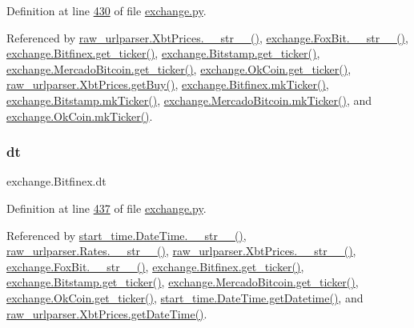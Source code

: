 Definition at line \hyperlink{exchange_8py_source_l00430}{430} of file \hyperlink{exchange_8py_source}{exchange.\+py}.



Referenced by \hyperlink{raw__urlparser_8py_source_l00074}{raw\+\_\+urlparser.\+Xbt\+Prices.\+\_\+\+\_\+str\+\_\+\+\_\+()}, \hyperlink{exchange_8py_source_l00610}{exchange.\+Fox\+Bit.\+\_\+\+\_\+str\+\_\+\+\_\+()}, \hyperlink{exchange_8py_source_l00439}{exchange.\+Bitfinex.\+get\+\_\+ticker()}, \hyperlink{exchange_8py_source_l00511}{exchange.\+Bitstamp.\+get\+\_\+ticker()}, \hyperlink{exchange_8py_source_l00651}{exchange.\+Mercado\+Bitcoin.\+get\+\_\+ticker()}, \hyperlink{exchange_8py_source_l00716}{exchange.\+Ok\+Coin.\+get\+\_\+ticker()}, \hyperlink{raw__urlparser_8py_source_l00062}{raw\+\_\+urlparser.\+Xbt\+Prices.\+get\+Buy()}, \hyperlink{exchange_8py_source_l00453}{exchange.\+Bitfinex.\+mk\+Ticker()}, \hyperlink{exchange_8py_source_l00525}{exchange.\+Bitstamp.\+mk\+Ticker()}, \hyperlink{exchange_8py_source_l00665}{exchange.\+Mercado\+Bitcoin.\+mk\+Ticker()}, and \hyperlink{exchange_8py_source_l00730}{exchange.\+Ok\+Coin.\+mk\+Ticker()}.

\mbox{\label{classexchange_1_1_bitfinex_adc9e5a19056dcc22e8028e749b233795}} 
\subsubsection{\texorpdfstring{dt}{dt}}
{\footnotesize\ttfamily exchange.\+Bitfinex.\+dt}



Definition at line \hyperlink{exchange_8py_source_l00437}{437} of file \hyperlink{exchange_8py_source}{exchange.\+py}.



Referenced by \hyperlink{start__time_2____init_____8py_source_l00034}{start\+\_\+time.\+Date\+Time.\+\_\+\+\_\+str\+\_\+\+\_\+()}, \hyperlink{raw__urlparser_8py_source_l00038}{raw\+\_\+urlparser.\+Rates.\+\_\+\+\_\+str\+\_\+\+\_\+()}, \hyperlink{raw__urlparser_8py_source_l00074}{raw\+\_\+urlparser.\+Xbt\+Prices.\+\_\+\+\_\+str\+\_\+\+\_\+()}, \hyperlink{exchange_8py_source_l00610}{exchange.\+Fox\+Bit.\+\_\+\+\_\+str\+\_\+\+\_\+()}, \hyperlink{exchange_8py_source_l00439}{exchange.\+Bitfinex.\+get\+\_\+ticker()}, \hyperlink{exchange_8py_source_l00511}{exchange.\+Bitstamp.\+get\+\_\+ticker()}, \hyperlink{exchange_8py_source_l00651}{exchange.\+Mercado\+Bitcoin.\+get\+\_\+ticker()}, \hyperlink{exchange_8py_source_l00716}{exchange.\+Ok\+Coin.\+get\+\_\+ticker()}, \hyperlink{start__time_2____init_____8py_source_l00031}{start\+\_\+time.\+Date\+Time.\+get\+Datetime()}, and \hyperlink{raw__urlparser_8py_source_l00059}{raw\+\_\+urlparser.\+Xbt\+Prices.\+get\+Date\+Time()}.

